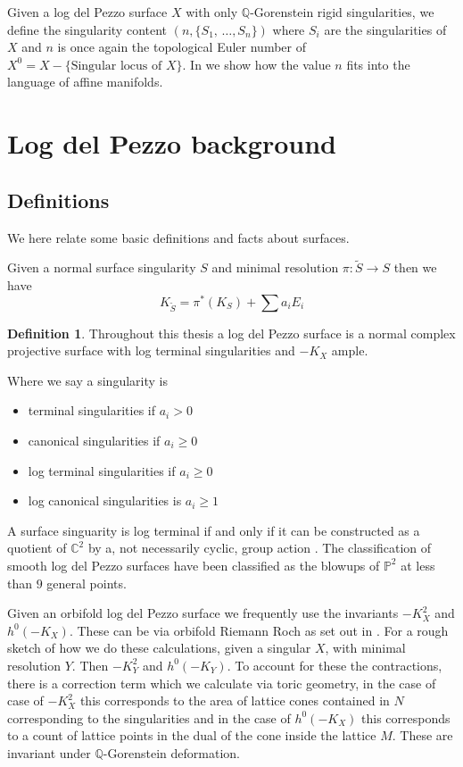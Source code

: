 \documentclass[12pt,a4paper]{book}      %
\theoremstyle{definition}
\newtheorem{dfn}[thm]{Definition}
\newcommand{\mb}[1]{\mathbb{#1}}
\newcommand{\ra}{\rightarrow}
\newcommand{\wt}[1]{\widetilde #1}
\begin{document}
Given a log del Pezzo surface $X$ with only $\mb{Q}$-Gorenstein rigid singularities, we define the singularity content $(n, \{S_1, \, \dots, S_n\})$ where $S_i$ are the singularities of $X$ and $n$ is once again the topological Euler number of $X^0 = X - \{\text{Singular locus of } X\}$. In \cite{Section 4} we show how the value $n$ fits into the language of affine manifolds.
\section{Log del Pezzo background}

\subsection{Definitions}
We here relate some basic definitions and facts about surfaces.

Given a normal surface singularity $S$ and minimal resolution $\pi \colon \wt{S} \ra S$ then we have 
\[
K_{\wt{S}} = \pi^*(K_S) + \sum a_i E_i
\] 
\begin{dfn}\label{Log Terminal}
Throughout this thesis a log del Pezzo surface is a normal complex projective surface with log terminal singularities and ${-}K_X$ ample.
\end{dfn}
Where we say a singularity is 
\begin{itemize}
\item terminal singularities if $a_i > 0$
\item canonical singularities if $a_i \geq 0$
\item log terminal singularities if $a_i \geq 0$
\item log canonical singularities is $a_i \geq 1$
\end{itemize}
A surface singuarity is log terminal if and only if it can be constructed as a quotient of $\mb{C}^2$  by a, not necessarily cyclic, group action \cite{Kawamata}. The classification of smooth log del Pezzo surfaces have been classified as the blowups of $\mb{P}^2$ at less than $9$ general points.

Given an orbifold log del Pezzo surface we frequently use the invariants 
${-}K_X^2$ and $h^0({-}K_X)$. These can be via orbifold Riemann Roch as set out in \cite{Young}. For a rough sketch of how we do these calculations, given a singular $X$, with minimal resolution $Y$. Then ${-}K_Y^2$ and $h^0({-}K_Y)$. To account for these the contractions, there is a correction term which we calculate via toric geometry, in the case of case of ${-}K_X^2$ this corresponds to the area of lattice cones contained in $N$ corresponding to the singularities and in the case of $h^0({-}K_X)$ this corresponds to a count of lattice points in the dual of the cone inside the lattice $M$.  These are invariant under $\mb{Q}$-Gorenstein deformation. 
 
\end{document}
